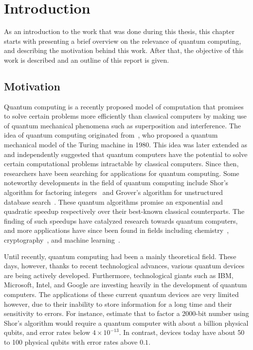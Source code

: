 \chapter{Introduction}
As an introduction to the work that was done during this thesis, this chapter starts with presenting a brief overview on the relevance of quantum computing, and describing the motivation behind this work.
After that, the objective of this work is described and an outline of this report is given.

\section{Motivation}
Quantum computing is a recently proposed model of computation that promises to solve certain problems more efficiently than classical computers by making use of quantum mechanical phenomena such as superposition and interference.
The idea of quantum computing originated from~\textcite{benioff1980computer}, who proposed a quantum mechanical model of the Turing machine in 1980.
This idea was later extended as \textcite{manin1980vychislimoe} and \textcite{feynman1982simulating} independently suggested that quantum computers have the potential to solve certain computational problems intractable by classical computers.
Since then, researchers have been searching for applications for quantum computing.
Some noteworthy developments in the field of quantum computing include Shor's algorithm for factoring integers~\cite{shor1999polynomial} and Grover's algorithm for unstructured database search~\cite{grover1996fast}.
These quantum algorithms promise an exponential and quadratic speedup respectively over their best-known classical counterparts.
The finding of such speedups have catalyzed research towards quantum computers, and more applications have since been found in fields including chemistry~\cite{mcardle2018quantum}, cryptography~\cite{bennett2014quantum}, and machine learning~\cite{biamonte2017quantum}.

Until recently, quantum computing had been a mainly theoretical field.
These days, however, thanks to recent technological advances, various quantum devices are being actively developed.
Furthermore, technological giants such as IBM, Microsoft, Intel, and Google are investing heavily in the development of quantum computers.
The applications of these current quantum devices are very limited however, due to their inability to store information for a long time and their sensitivity to errors.
For instance, \textcite[Appendix~M]{fowler2012surface} estimate that to factor a 2000-bit number using Shor's algorithm would require a quantum computer with about a billion physical qubits, and error rates below $4 \times 10^{-13}$.
In contrast, devices today have about 50 to 100 physical qubits with error rates above $0.1$.

